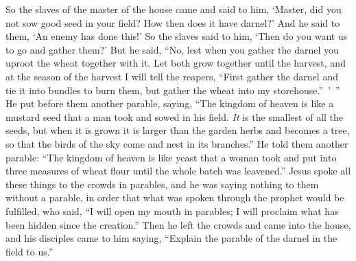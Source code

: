 \begin{biblechapter}
\verse So the slaves of the master of the house came and said to him, ‘Master, did you not sow good seed in your field? How then does it have darnel?’
\verse And he said to them, ‘An enemy has done this!’ So the slaves said to him, ‘Then do you want us to go and gather them?’
\verse But he said, “No, lest when you gather the darnel you uproot the wheat together with it.
\verse Let both grow together until the harvest, and at the season of the harvest I will tell the reapers, “First gather the darnel and tie it into bundles to burn them, but gather the wheat into my storehouse.” ’ ”
 He put before them another parable, saying, “The kingdom of heaven is like a mustard seed that a man took and sowed in his field.
\verse \textit{It} is the smallest of all the seeds, but when it is grown it is larger than the garden herbs and becomes a tree, so that the birds of the sky come and nest in its branches.”
 He told them another parable: “The kingdom of heaven is like yeast that a woman took and put into three measures of wheat flour until the whole batch was leavened.”
 Jesus spoke all these things to the crowds in parables, and he was saying nothing to them without a parable,
\verse in order that what was spoken through the prophet would be fulfilled, who said, “I will open my mouth in parables; 
I will proclaim what has been hidden since the creation.”
 Then he left the crowds and came into the house, and his disciples came to him saying, “Explain the parable of the darnel in the field to us.”

\end{biblechapter}
